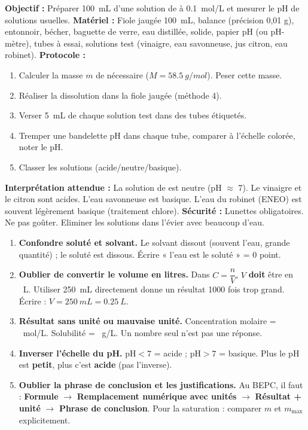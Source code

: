 \documentclass[11pt]{article}
\begin{document}
\begin{experience}
\textbf{Objectif :} Préparer \SI{100}{mL} d'une solution de  à \SI{0,1}{mol/L} et mesurer le pH de solutions usuelles.
\textbf{Matériel :} Fiole jaugée \SI{100}{mL}, balance (précision 0,01 g), entonnoir, bécher, baguette de verre, eau distillée,  solide, papier pH (ou pH-mètre), tubes à essai, solutions test (vinaigre, eau savonneuse, jus citron, eau robinet).
\textbf{Protocole :}
\begin{enumerate}
\item Calculer la masse $m$ de  nécessaire ($M = \SI{58,5}{g/mol}$). Peser cette masse.
\item Réaliser la dissolution dans la fiole jaugée (méthode 4).
\item Verser \SI{5}{mL} de chaque solution test dans des tubes étiquetés.
\item Tremper une bandelette pH dans chaque tube, comparer à l'échelle colorée, noter le pH.
\item Classer les solutions (acide/neutre/basique).
\end{enumerate}
\textbf{Interprétation attendue :} La solution de  est neutre (pH $\approx$ 7). Le vinaigre et le citron sont acides. L'eau savonneuse est basique. L'eau du robinet (ENEO) est souvent légèrement basique (traitement chlore).
\textbf{Sécurité :} Lunettes obligatoires. Ne pas goûter. Eliminer les solutions dans l'évier avec beaucoup d'eau.
\end{experience}

\begin{attention}
\begin{enumerate}
\item \textbf{Confondre soluté et solvant.} Le solvant dissout (souvent l'eau, grande quantité) ; le soluté est dissous. Écrire « l'eau est le soluté » = 0 point.
\item \textbf{Oublier de convertir le volume en litres.} Dans $C = \dfrac{n}{V}$, $V$ \textbf{doit} être en \SI{}{L}. Utiliser \SI{250}{mL} directement donne un résultat 1000 fois trop grand. Écrire : $V = \SI{250}{mL} = \SI{0,25}{L}$.
\item \textbf{Résultat sans unité ou mauvaise unité.} Concentration molaire = \SI{}{mol/L}. Solubilité = \SI{}{g/L}. Un nombre seul n'est pas une réponse.
\item \textbf{Inverser l'échelle du pH.} $\text{pH} < 7$ = acide ; $\text{pH} > 7$ = basique. Plus le pH est \textbf{petit}, plus c'est \textbf{acide} (pas l'inverse).
\item \textbf{Oublier la phrase de conclusion et les justifications.} Au BEPC, il faut : \textbf{Formule} $\rightarrow$ \textbf{Remplacement numérique avec unités} $\rightarrow$ \textbf{Résultat + unité} $\rightarrow$ \textbf{Phrase de conclusion}. Pour la saturation : comparer $m$ et $m_{\max}$ explicitement.
\end{enumerate}
\end{attention}
\end{document}
